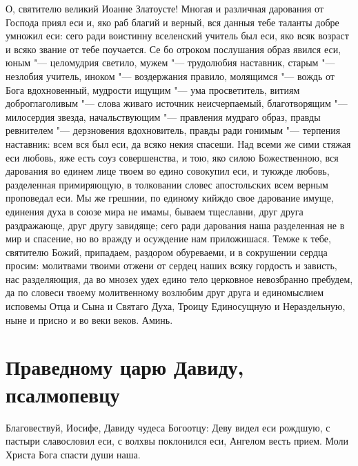 О, святителю великий Иоанне Златоусте! Многая и различная дарования от Господа приял еси и, яко раб благий и верный, вся данныя тебе таланты добре умножил еси: сего ради воистинну вселенский учитель был еси, яко всяк возраст и всяко звание от тебе поучается. Се бо отроком послушания образ явился еси, юным "--- целомудрия светило, мужем "--- трудолюбия наставник, старым "--- незлобия учитель, иноком "--- воздержания правило, молящимся "--- вождь от Бога вдохновенный, мудрости ищущим "--- ума просветитель, витиям доброглаголивым "--- слова живаго источник неисчерпаемый, благотворящим "--- милосердия звезда, начальствующим "--- правления мудраго образ, правды ревнителем "--- дерзновения вдохновитель, правды ради гонимым "--- терпения наставник: всем вся был еси, да всяко некия спасеши. Над всеми же сими стяжая еси любовь, яже есть соуз совершенства, и тою, яко силою Божественною, вся дарования во единем лице твоем во едино совокупил еси, и туюжде любовь, разделенная примиряющую, в толковании словес апостольских всем верным проповедал еси. Мы же грешнии, по единому кийждо свое дарование имуще, единения духа в союзе мира не имамы, бываем тщеславни, друг друга раздражающе, друг другу завидяще; сего ради дарования наша разделенная не в мир и спасение, но во вражду и осуждение нам приложишася. Темже к тебе, святителю Божий, припадаем, раздором обуреваеми, и в сокрушении сердца просим: молитвами твоими отжени от сердец наших всяку гордость и зависть, нас разделяющия, да во мнозех удех едино тело церковное невозбранно пребудем, да по словеси твоему молитвенному возлюбим друг друга и единомыслием исповемы Отца и Сына и Святаго Духа, Троицу Единосущную и Нераздельную, ныне и присно и во веки веков. Аминь.
\mychapterending


 

\section{Праведному царю Давиду, псалмопевцу}
 




Благовествуй, Иосифе, Давиду чудеса Богоотцу: Деву видел еси рождшую, с пастыри славословил еси, с волхвы поклонился еси, Ангелом весть прием. Моли Христа Бога спасти души наша.





